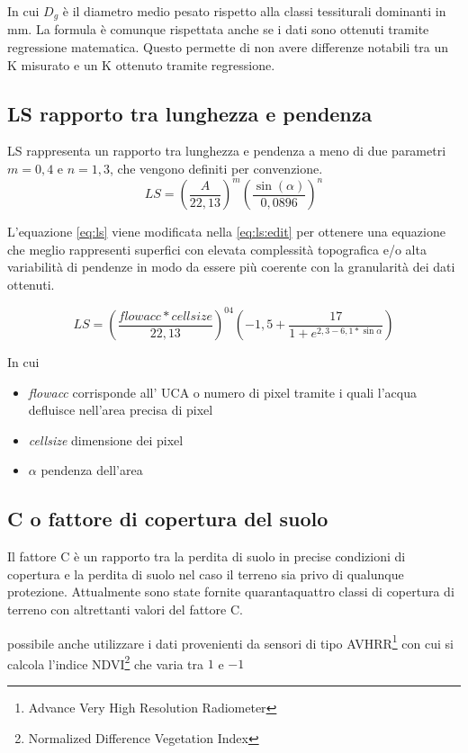 In cui $D_g$ è il diametro medio pesato rispetto alla classi tessiturali dominanti in mm.
La formula è comunque rispettata anche se i dati sono ottenuti tramite regressione matematica. Questo permette di non avere differenze notabili tra un K misurato e un K ottenuto tramite regressione.

\subsection{LS rapporto tra lunghezza e pendenza}
LS rappresenta un rapporto tra lunghezza e pendenza a meno di due parametri $m=0,4$ e $n=1,3$, che vengono definiti per convenzione.
\begin{equation}\label{eq:ls}
	LS = \left(  \dfrac{A}{22,13} \right)^m
	\left(  \dfrac{\sin(\alpha)}{0,0896} \right)^n
\end{equation}

L'equazione \eqref{eq:ls} viene modificata nella \eqref{eq:ls:edit} per ottenere una equazione che meglio rappresenti superfici con elevata complessità topografica e/o alta variabilità di pendenze in modo da essere più coerente con la granularità dei dati ottenuti.

\begin{equation}\label{eq:ls:edit}
LS=\left( \dfrac{flowacc * cellsize}{22,13}\right)^{04} \left( -1,5+\dfrac{17}{1+ e^{2,3-6,1*\sin{\alpha}}} \right)
\end{equation}

In cui
\begin{itemize}
	\item \textit{flowacc} corrisponde all' UCA  o numero di pixel tramite i quali l'acqua defluisce nell'area precisa di pixel
	\item \textit{cellsize} dimensione dei pixel
	\item \textit{$\alpha$} pendenza dell'area
\end{itemize}

\subsection{C o fattore di copertura del suolo}
Il fattore C è un rapporto tra la perdita di suolo in precise condizioni di copertura e la perdita di suolo nel caso il terreno sia privo di qualunque protezione.
Attualmente sono state fornite quarantaquattro classi di copertura di terreno con altrettanti valori del fattore C.

\egrave possibile anche utilizzare i dati provenienti da sensori di tipo AVHRR\footnote{Advance Very High Resolution Radiometer} con cui si calcola l'indice  NDVI\footnote{Normalized Difference Vegetation Index} che varia tra $1$ e $-1$

